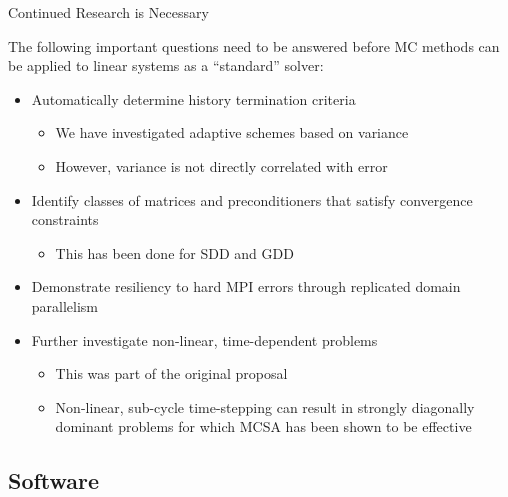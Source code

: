 \documentclass{beamer}
\begin{document}
\begin{frame}{Continued Research is Necessary}

  The following important questions need to be answered before MC methods can
  be applied to linear systems as a ``standard'' solver:

  \begin{itemize}
  \item Automatically determine history termination criteria
    \begin{itemize}
    \item We have investigated adaptive schemes based on variance
    \item However, variance is not directly correlated with error
    \end{itemize}
  \item Identify classes of matrices and preconditioners that satisfy
    convergence constraints
    \begin{itemize}
    \item This has been done for SDD and GDD
    \end{itemize}
  \item Demonstrate resiliency to hard MPI errors through replicated domain
    parallelism
  \item Further investigate non-linear, time-dependent problems
    \begin{itemize}
    \item This was part of the original proposal
    \item Non-linear, sub-cycle time-stepping can result in strongly diagonally
      dominant problems for which MCSA has been shown to be effective
    \end{itemize}
  \end{itemize}
\end{frame}

\subsection{Software}
\end{document}
